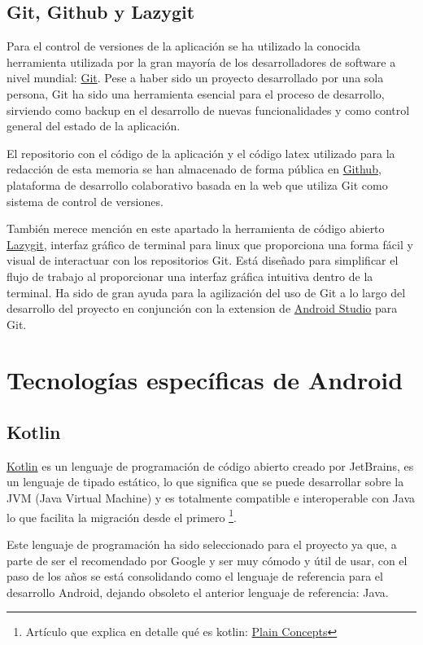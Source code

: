 \subsection{Git, Github y Lazygit}
Para el control de versiones de la aplicación se ha utilizado la conocida herramienta utilizada por la gran mayoría de los desarrolladores de software a nivel mundial: \href{https://git-scm.com/}{Git}. Pese a haber sido un proyecto desarrollado por una sola persona, Git ha sido una herramienta esencial para el proceso de desarrollo, sirviendo como backup en el desarrollo de nuevas funcionalidades y como control general del estado de la aplicación. 

El repositorio con el código de la aplicación y el código latex utilizado para la redacción de esta memoria se han almacenado de forma pública en \href{https://github.com/}{Github}, plataforma de desarrollo colaborativo basada en la web que utiliza Git como sistema de control de versiones.

También merece mención en este apartado la herramienta de código abierto \href{https://github.com/jesseduffield/lazygit}{Lazygit}, interfaz gráfico de terminal para linux que proporciona una forma fácil y visual de interactuar con los repositorios Git. Está diseñado para simplificar el flujo de trabajo al proporcionar una interfaz gráfica intuitiva dentro de la terminal. Ha sido de gran ayuda para la agilización del uso de Git a lo largo del desarrollo del proyecto en conjunción con la extension de \hyperlink{subsec:android_studio}{Android Studio} para Git.
\section{Tecnologías específicas de Android}

\hypertarget{subsec:kotlin}{}
\subsection{Kotlin}
\href{https://kotlinlang.org/}{Kotlin} es un lenguaje de programación de código abierto creado por JetBrains, es un lenguaje de tipado estático, lo que significa que se puede desarrollar sobre la JVM (Java Virtual Machine) y es totalmente compatible e interoperable con Java lo que facilita la migración desde el primero \footnote{Artículo que explica en detalle qué es kotlin: \href{https://www.plainconcepts.com/es/kotlin-android/}{Plain Concepts}}. 

Este lenguaje de programación ha sido seleccionado para el proyecto ya que, a parte de ser el recomendado por Google y ser muy cómodo y útil de usar, con el paso de los años se está consolidando como el lenguaje de referencia para el desarrollo Android, dejando obsoleto el anterior lenguaje de referencia: Java.
